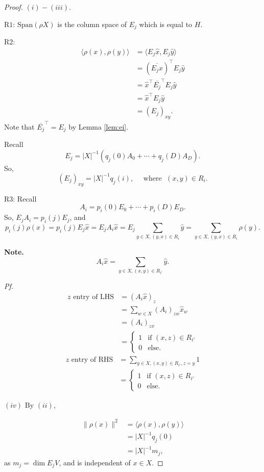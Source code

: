 \documentclass[
]{book}
\theoremstyle{definition}
\theoremstyle{definition}
\theoremstyle{definition}
\theoremstyle{definition}
\theoremstyle{remark}
\begin{document}
\begin{proof}
\leavevmode

\((i)-(iii)\).

\(\mathrm{R1}\): \(\mathrm{Span}(\rho X)\) is the column space of \(E_j\) which is equal to \(H\).

\(\mathrm{R2}\):
\begin{align}
\langle \rho(x),\rho(y)\rangle & = \langle E_j\hat{x}, E_j\hat{y}\rangle \\
& = (\overline{E_j\hat{x}})^\top E_j\hat{y}\\
& = \hat{x}^\top \overline{E_j}^\top E_j\hat{y}\\
& = \hat{x}^\top E_j \hat{y}\\
& = (E_j)_{xy}.
\end{align}
Note that \(\overline{E_j}^\top = E_j\) by Lemma \ref{lem:ei}.

Recall
\[E_j = |X|^{-1}(q_j(0)A_0 + \cdots + q_j(D)A_D).\]
So,
\[(E_j)_{xy} = |X|^{-1}q_j(i), \quad \text{ where } \; (x,y)\in R_i.\]

\(\mathrm{R3}\): Recall
\[A_i = p_i(0)E_0 + \cdots + p_i(D)E_D.\]
So,
\(E_jA_i = p_i(j)E_j\), and
\[p_i(j)\rho(x) = p_i(j)E_j\hat{x} = E_jA_i\hat{x} = E_j\sum_{y\in X, (y,x)\in R_i}\hat{y} = \sum_{y\in X, (y,x)\in R_i}\rho(y).\]

\textbf{Note.}
\[A_i\hat{x} = \sum_{y\in X, (x,y)\in R_{i'}}\hat{y}.\]

\emph{Pf.}
\begin{align}
\text{$z$ entry of LHS} & = (A_i\hat{x})_z \\
& = \sum_{w\in X}(A_i)_{zw}\hat{x}_w\\
& = (A_i)_{zx}\\
& = \begin{cases}
1 & \text{if $(x,z)\in R_{i'}$}\\
0 & \text{else}.
\end{cases}
\end{align}
\begin{align}
\text{$z$ entry of RHS} & = \sum_{y\in X, (x,y)\in R_{i'}, z = y}1\\
& = \begin{cases}
1 & \text{if $(x,z)\in R_{i'}$}\\
0 & \text{else}.
\end{cases}
\end{align}

\((iv)\) By \((ii)\),

\begin{align}
\|\rho(x)\|^2 & = \langle \rho(x), \rho(y)\rangle\\
& = |X|^{-1}q_j(0)\\
& = |X|^{-1}m_j,
\end{align}
as \(m_j = \dim E_jV\), and is independent of \(x\in X\).


\end{proof}
\end{document}

